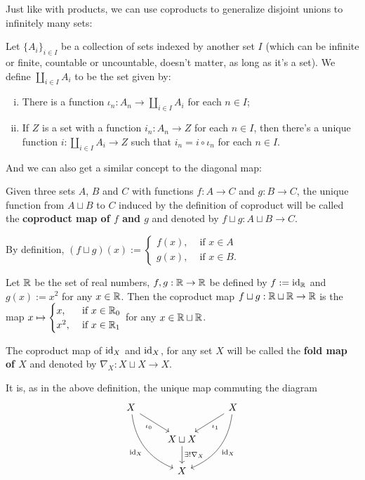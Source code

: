 Just like with products, we can use coproducts to generalize disjoint unions to infinitely many sets:

\begin{df}
	Let $\{A_i\}_{i\in I}$ be a collection of sets indexed by another set $I$ (which can be infinite or finite, countable or uncountable, doesn't matter, as long as it's a set). We define $\coprod_{i\in I}A_i$ to be the set given by:
	\begin{enumerate}[i.]
		\item There is a function $\iota_n:A_n\to \coprod_{i\in I}A_i$ for each $n\in I$;
		\item If $Z$ is a set with a function $i_n:A_n\to Z$ for each $n\in I$, then there's a unique function $i:\coprod_{i\in I}A_i\to Z$ such that $i_n=i\circ\iota_n$ for each $n\in I$.
	\end{enumerate}
\end{df}

And we can also get a similar concept to the diagonal map:

\begin{df}
	Given three sets $A$, $B$ and $C$ with functions $f:A\to C$ and $g:B\to C$, the unique function from $A\sqcup B$ to $C$ induced by the definition of coproduct will be called the \textbf{coproduct map of $f$ and $g$} and denoted by $f\sqcup g:A\sqcup B\to C$.
\end{df}

By definition, $(f\sqcup g)(x):=\begin{cases}
f(x),& \mbox{ if }x\in A\\
g(x),& \mbox{ if }x\in B.
\end{cases}$

\begin{ex}
	Let $\mathbb R$ be the set of real numbers, $f,g:\mathbb R\to \mathbb R$ be defined by $f:={\rm id}_\mathbb R$ and $g(x):=x^2$ for any $x\in\mathbb R$. Then the coproduct map $f\sqcup g:\mathbb R\sqcup\mathbb R\to\mathbb R$ is the map $x\mapsto\begin{cases}
	x,&\mbox{ if }x\in\mathbb R_0\\
	x^2,&\mbox{ if }x\in\mathbb R_1
	\end{cases}$ for any $x\in \mathbb R\sqcup\mathbb R$.
\end{ex}

\begin{df}
	The coproduct map of ${\rm id}_X$ and ${\rm id}_X$, for any set $X$ will be called the \textbf{fold map of $X$} and denoted by $\nabla_X:X\sqcup X\to X$.
	
	It is, as in the above definition, the unique map commuting the diagram
	\[\begin{tikzcd}
	X \arrow[rdd, "\id_X"', bend right] \arrow[rd, "\iota_0"'] &                                         & X \arrow[ldd, "\id_X", bend left] \arrow[ld, "\iota_1"] \\
	& X\sqcup X \arrow[d, "\exists!\nabla_X"] &                                                         \\
	& X                                       &                                                        
	\end{tikzcd}\]
\end{df}

